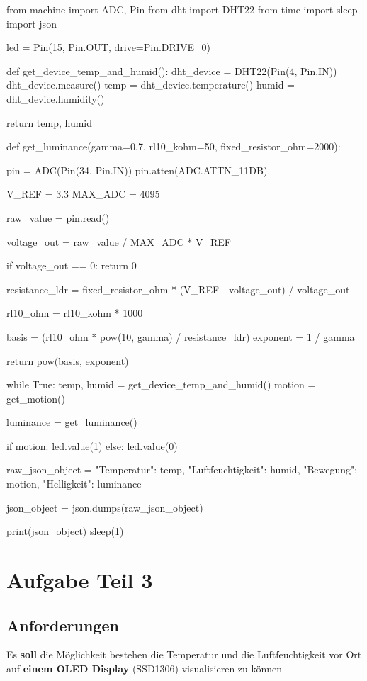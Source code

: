 \documentclass[18pt]{article}
\begin{document}
\begin{python}
from machine import ADC, Pin
from dht import DHT22
from time import sleep
import json
	
led = Pin(15, Pin.OUT, drive=Pin.DRIVE_0)
	
def get_device_temp_and_humid():
	dht_device = DHT22(Pin(4, Pin.IN))
	dht_device.measure()
	temp = dht_device.temperature()
	humid = dht_device.humidity()
	
	return temp, humid
	
def get_luminance(gamma=0.7, 
	rl10_kohm=50, fixed_resistor_ohm=2000):
	
	pin = ADC(Pin(34, Pin.IN))
	pin.atten(ADC.ATTN_11DB)
	
	V_REF = 3.3 
	MAX_ADC = 4095
	
	raw_value = pin.read() 
	
	voltage_out = raw_value / MAX_ADC * V_REF
	
	if voltage_out == 0:
		return 0
	
	resistance_ldr = fixed_resistor_ohm * (V_REF - voltage_out) / voltage_out
	
	rl10_ohm = rl10_kohm * 1000 
	
	basis = (rl10_ohm * pow(10, gamma) / resistance_ldr)
	exponent = 1 / gamma
	
	return pow(basis, exponent)
		
while True:
	temp, humid = get_device_temp_and_humid()
	motion = get_motion()
	
	luminance = get_luminance()
	
	if motion:
		led.value(1)
	else:
		led.value(0)
	
	raw_json_object = {
		"Temperatur": temp,
		"Luftfeuchtigkeit": humid,
		"Bewegung": motion,
		"Helligkeit": luminance
	}
	
	json_object = json.dumps(raw_json_object)
	
	print(json_object)
	sleep(1)
\end{python}
\newpage

\section{Aufgabe Teil 3}
\label{sec:aufgabe3}
\subsection{Anforderungen}
Es \textbf{soll} die Möglichkeit bestehen die Temperatur und die Luftfeuchtigkeit vor 
Ort auf \textbf{einem OLED Display} (SSD1306) visualisieren zu können
\end{document}

